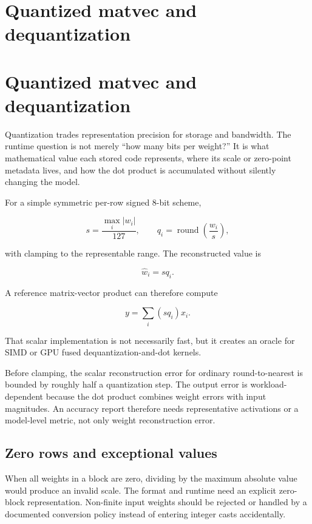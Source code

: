 \hypertarget{appendix-241c0e42ac2d}{}
\section*{Quantized matvec and dequantization}
\section{Quantized matvec and dequantization}\label{appendix-241c0e42ac2d-quantized-matvec-and-dequantization}

Quantization trades representation precision for storage and bandwidth. The runtime question is not merely ``how many bits per weight?'' It is what mathematical value each stored code represents, where its scale or zero-point metadata lives, and how the dot product is accumulated without silently changing the model.

For a simple symmetric per-row signed 8-bit scheme,

\[
s = \frac{\max_i |w_i|}{127},
\qquad
q_i = \operatorname{round}\!\left(\frac{w_i}{s}\right),
\]

with clamping to the representable range. The reconstructed value is

\[
\hat w_i = s q_i.
\]

A reference matrix-vector product can therefore compute

\[
y = \sum_i (s q_i)x_i.
\]

That scalar implementation is not necessarily fast, but it creates an oracle for SIMD or GPU fused dequantization-and-dot kernels.

Before clamping, the scalar reconstruction error for ordinary round-to-nearest is bounded by roughly half a quantization step. The output error is workload-dependent because the dot product combines weight errors with input magnitudes. An accuracy report therefore needs representative activations or a model-level metric, not only weight reconstruction error.

\subsection{Zero rows and exceptional values}\label{appendix-241c0e42ac2d-zero-rows-and-exceptional-values}

When all weights in a block are zero, dividing by the maximum absolute value would produce an invalid scale. The format and runtime need an explicit zero-block representation. Non-finite input weights should be rejected or handled by a documented conversion policy instead of entering integer casts accidentally.


